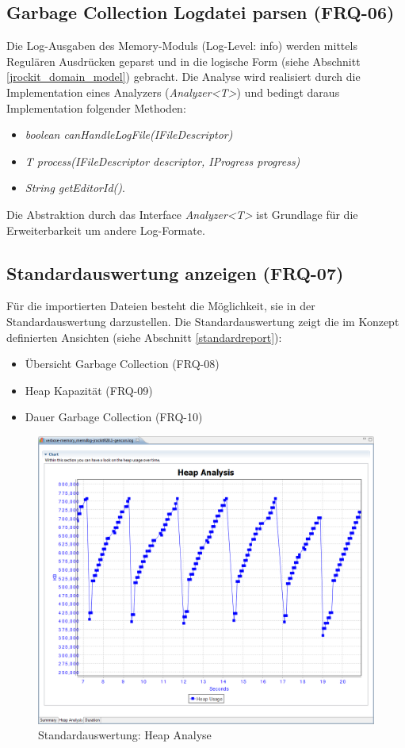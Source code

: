 \subsection{Garbage Collection Logdatei parsen (FRQ-06)}
Die Log-Ausgaben des Memory-Moduls (Log-Level: info) werden mittels Regulären Ausdrücken geparst und in die logische Form (siehe Abschnitt \ref{jrockit_domain_model}) gebracht. Die Analyse wird realisiert durch die Implementation eines Analyzers (\textit{Analyzer\textless T\textgreater}) und bedingt daraus Implementation folgender Methoden:
\begin{itemize}
\item \textit{boolean canHandleLogFile(IFileDescriptor)}
\item \textit{T process(IFileDescriptor descriptor, IProgress progress)}
\item \textit{String getEditorId()}.
\end{itemize}
Die Abstraktion durch das Interface \textit{Analyzer\textless T\textgreater} ist Grundlage für die Erweiterbarkeit um andere Log-Formate.

\subsection{Standardauswertung anzeigen (FRQ-07)}
Für die importierten Dateien besteht die Möglichkeit, sie in der Standardauswertung darzustellen. Die Standardauswertung zeigt die im Konzept definierten Ansichten (siehe Abschnitt \ref{standardreport}):
\begin{itemize}
\item Übersicht Garbage Collection (FRQ-08)
\item Heap Kapazität (FRQ-09)
\item Dauer Garbage Collection (FRQ-10)
\end{itemize}

 \begin{figure}[H]
  	\centering
    	\includegraphics[width=15cm]{images/tutorial_standardreport_heapanalysis}
        	\caption{Standardauswertung: Heap Analyse}
\end{figure}

